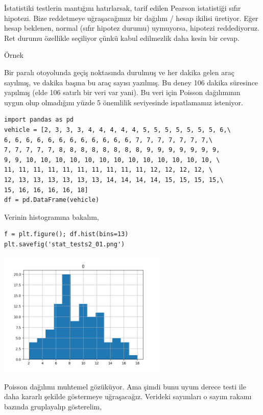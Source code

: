 \documentclass[12pt,fleqn]{article}\usepackage{../../common}
\begin{document}
İstatistiki testlerin mantığını hatırlarsak, tarif edilen Pearson
istatistiği sıfır hipotezi. Bize reddetmeye uğraşacağımız bir dağılım /
hesap ikilisi üretiyor. Eğer hesap beklenen, normal (sıfır hipotez durumu)
uymuyorsa, hipotezi reddediyoruz. Ret durumu özellikle seçiliyor çünkü
kabul edilmezlik daha kesin bir cevap. 

Örnek

Bir paralı otoyolunda geçiş noktasında durulmuş ve her dakika gelen araç
sayılmış, ve dakika başına bu araç sayısı yazılmış. Bu deney 106 dakika
süresince yapılmış (elde 106 satırlı bir veri var yani). Bu veri için
Poisson dağılımının uygun olup olmadığını yüzde 5 önemlilik seviyesinde
ispatlamamız isteniyor.

\begin{verbatim}
import pandas as pd
vehicle = [2, 3, 3, 3, 4, 4, 4, 4, 4, 5, 5, 5, 5, 5, 5, 5, 6,\
6, 6, 6, 6, 6, 6, 6, 6, 6, 6, 6, 6, 7, 7, 7, 7, 7, 7, 7,\
7, 7, 7, 7, 7, 8, 8, 8, 8, 8, 8, 8, 8, 9, 9, 9, 9, 9, 9, 9,
9, 9, 10, 10, 10, 10, 10, 10, 10, 10, 10, 10, 10, 10, 10, \
11, 11, 11, 11, 11, 11, 11, 11, 11, 11, 12, 12, 12, 12, \
12, 13, 13, 13, 13, 13, 13, 14, 14, 14, 14, 15, 15, 15, 15,\
15, 16, 16, 16, 16, 18]
df = pd.DataFrame(vehicle)
\end{verbatim}

Verinin histogramına bakalım,

\begin{verbatim}
f = plt.figure(); df.hist(bins=13)
plt.savefig('stat_tests2_01.png')
\end{verbatim}

\includegraphics[height=6cm]{stat_tests2_01.png}

Poisson dağılımı muhtemel gözüküyor. Ama şimdi bunu uyum derece testi ile
daha kararlı şekilde göstermeye uğraşacağız. Verideki sayımları o sayım
rakamı bazında gruplayalıp gösterelim,
\end{document}
